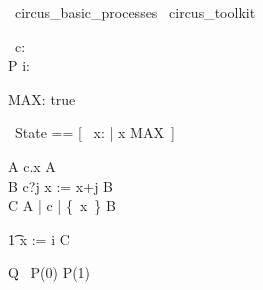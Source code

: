 
\begin{zsection}
  \SECTION\ circus\_basic\_processes \parents\ circus\_toolkit
\end{zsection}

\begin{circus}
    \circchannel\ c: \nat \\
    \circprocess P \circdef i: \nat \circspot \circbegin 
\end{circus}

\begin{axdef}
     MAX: \nat
\where
     true
\end{axdef}

\begin{circusaction}
    \circstate\ State == [~ x: \nat | x \leq MAX~]
\end{circusaction}

\begin{circusaction}
     A \circdef c.x \then A \\
     B \circdef c?j \then x := x+j \circseq B \\
     C \circdef A \lpar \emptyset | \lchanset c \rchanset | \{~x~\} \rpar B 
\end{circusaction}

\begin{circusaction}
    \t1 \circspot x := i \circseq C
\end{circusaction}

\begin{circus}
    \circend
\end{circus}

\begin{circus}
     \circprocess Q \circdef\ P(0) \extchoice P(1)
\end{circus}

